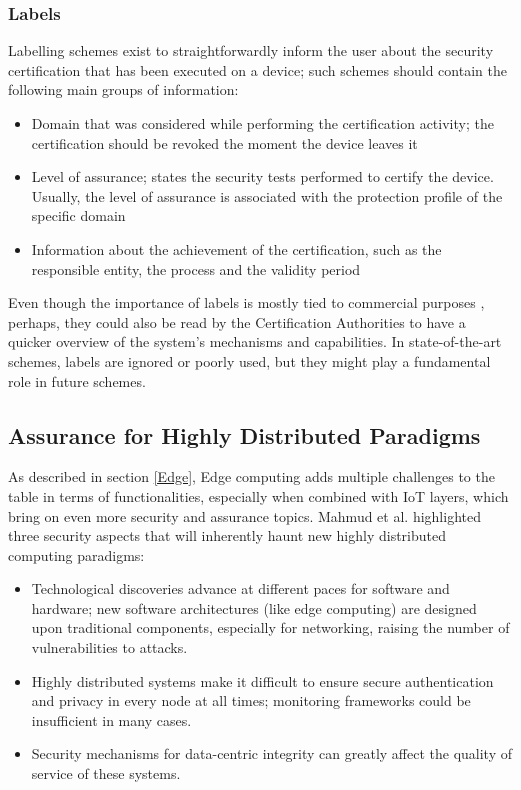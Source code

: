 \subsubsection{Labels}
Labelling schemes exist to straightforwardly inform the user about the security certification that has been executed on a device; such schemes should contain the following main groups of information:

\begin{itemize}
    \item Domain that was considered while performing the certification activity; the certification should be revoked the moment the device leaves it

    \item Level of assurance; states the security tests performed to certify the device. Usually, the level of assurance is associated with the protection profile of the specific domain

    \item  Information about the achievement of the certification, such as the responsible entity, the process and the validity period

\end{itemize}

Even though the importance of labels is mostly tied to commercial purposes \cite{baldini2016security}, perhaps, they could also be read by the Certification Authorities to have a quicker overview of the system's mechanisms and capabilities. In state-of-the-art schemes, labels are ignored or poorly used, but they might play a fundamental role in future schemes.


\subsection{Assurance for Highly Distributed Paradigms}
As described in section \ref{Edge}, Edge computing adds multiple challenges to the table in terms of functionalities, especially when combined with IoT layers, which bring on even more security and assurance topics. Mahmud et al. \cite{mahmud2018fog} highlighted three security aspects that will inherently haunt new highly distributed computing paradigms:
\begin{itemize}

\item Technological discoveries advance at different paces for software and hardware; new software architectures (like edge computing) are designed upon traditional components, especially for networking, raising the number of vulnerabilities to attacks.

\item Highly distributed systems make it difficult to ensure secure authentication and privacy in every node at all times; monitoring frameworks could be insufficient in many cases.

\item Security mechanisms for data-centric integrity can greatly affect the quality of service of these systems.

\end{itemize}


